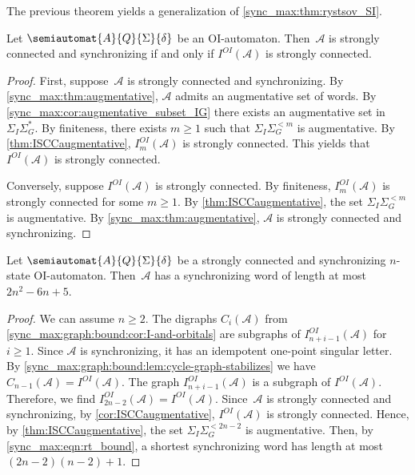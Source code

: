 The previous theorem yields a generalization of \cref{sync_max:thm:rystsov_SI}.

\begin{corollary} \label{cor:ISCCaugmentative}
	Let $\semiautomat{A}{Q}{\Sigma}{\delta}$ be an OI-automaton.
	Then~$\mathcal A$ is strongly connected and synchronizing if and only if $I^{OI}(\mathcal A)$
	is strongly connected.
\end{corollary}
\begin{proof}
	First, suppose~$\mathcal A$ is strongly connected and synchronizing.
	By \cref{sync_max:thm:augmentative}, $\mathcal A$ admits an augmentative set of words.
	By \cref{sync_max:cor:augmentative_subset_IG} there exists an augmentative set
	in $\Sigma_I\Sigma_G^*$.
	By finiteness, there exists $m \ge 1$ such that $\Sigma_I\Sigma_G^{< m}$
	is augmentative.
	By \cref{thm:ISCCaugmentative}, $I_m^{OI}(\mathcal A)$
	is strongly connected. This yields that $I^{OI}(\mathcal A)$ is strongly connected.
	
	Conversely, suppose $I^{OI}(\mathcal A)$ is strongly connected.
	By finiteness, $I_m^{OI}(\mathcal A)$ is strongly connected for some $m \ge 1$.
	By \cref{thm:ISCCaugmentative}, the set $\Sigma_I \Sigma_G^{< m}$
	is augmentative.
	By \cref{sync_max:thm:augmentative}, $\mathcal A$
	is strongly connected and synchronizing.	
\end{proof}

\begin{theorem} \label{sync_max:graphs:bound:thm:bound}
	Let $\semiautomat{A}{Q}{\Sigma}{\delta}$ be a strongly connected and synchronizing $n$-state OI-automaton.
	Then~$\mathcal A$ has a synchronizing word of length at most $2n^2 - 6n + 5$.
\end{theorem}
\begin{proof}
	We can assume $n \ge 2$. 
	The digraphs $C_i(\mathcal A)$
	from \cref{sync_max:graph:bound:cor:I-and-orbitals}
	are subgraphs of $I_{n + i - 1}^{OI}(\mathcal A)$ for $i \ge 1$.
	Since $\mathcal A$ is synchronizing,
	it has an idempotent one-point singular letter.
	By \cref{sync_max:graph:bound:lem:cycle-graph-stabilizes}
	we have $C_{n - 1}(\mathcal A) = I^{OI}(\mathcal A)$.	
	The graph $I_{n + i - 1}^{OI}(\mathcal A)$ is a subgraph of $I^{OI}(\mathcal A)$.
	Therefore, we find $I_{2n - 2}^{OI}(\mathcal A) = I^{OI}(\mathcal A)$.
	Since~$\mathcal A$ is strongly connected and synchronizing,
	by \cref{cor:ISCCaugmentative}, $I^{OI}(\mathcal A)$ is strongly connected.
	Hence, by \cref{thm:ISCCaugmentative}, 
	the set $\Sigma_I\Sigma_G^{< 2n-2}$ is augmentative.
	Then, by \cref{sync_max:eqn:rt_bound}, a shortest synchronizing word has length at most
	$
	(2n-2) (n - 2) + 1.
	$
\end{proof}